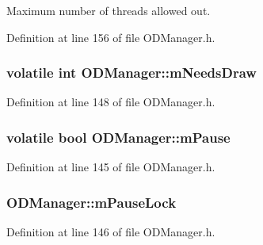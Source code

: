 Maximum number of threads allowed out. 



Definition at line 156 of file O\+D\+Manager.\+h.

\subsubsection[{\texorpdfstring{m\+Needs\+Draw}{mNeedsDraw}}]{\setlength{\rightskip}{0pt plus 5cm}volatile {\bf int} O\+D\+Manager\+::m\+Needs\+Draw\hspace{0.3cm}{\ttfamily [protected]}}\hypertarget{class_o_d_manager_ac03e55bb072bc1e81e73a7d86523b6f4}{}\label{class_o_d_manager_ac03e55bb072bc1e81e73a7d86523b6f4}


Definition at line 148 of file O\+D\+Manager.\+h.

\subsubsection[{\texorpdfstring{m\+Pause}{mPause}}]{\setlength{\rightskip}{0pt plus 5cm}volatile {\bf bool} O\+D\+Manager\+::m\+Pause\hspace{0.3cm}{\ttfamily [protected]}}\hypertarget{class_o_d_manager_aebe05c8e1092dcca2db0a69236316dcd}{}\label{class_o_d_manager_aebe05c8e1092dcca2db0a69236316dcd}


Definition at line 145 of file O\+D\+Manager.\+h.

\subsubsection[{\texorpdfstring{m\+Pause\+Lock}{mPauseLock}}]{ O\+D\+Manager\+::m\+Pause\+Lock\hspace{0.3cm}{\ttfamily [protected]}}\hypertarget{class_o_d_manager_a59f76b74b2ee0e6ffb44e954fef857e8}{}\label{class_o_d_manager_a59f76b74b2ee0e6ffb44e954fef857e8}


Definition at line 146 of file O\+D\+Manager.\+h.

